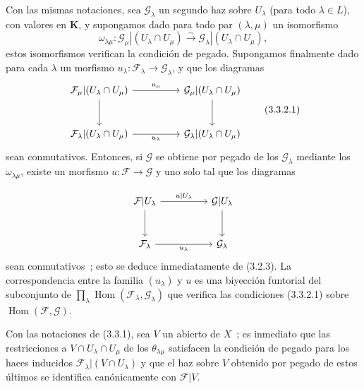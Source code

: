 \begin{env}[3.3.2]
\label{0.3.3.2-fr}
Con las mismas notaciones, sea $\mathcal{G}_\lambda$ un segundo haz sobre
$U_\lambda$ (para todo $\lambda\in L$), con valores en $\boldsymbol{K}$, y supongamos
dado para todo par $(\lambda,\mu)$ un isomorfismo
\[
  \omega_{\lambda\mu}:
  \mathcal{G}_\mu|(U_\lambda\cap U_\mu)
  \xrightarrow{\sim}
  \mathcal{G}_\lambda|(U_\lambda\cap U_\mu),
\]
estos isomorfismos verifican la condición de pegado. Supongamos finalmente dado
para cada $\lambda$ un morfismo
$u_\lambda:\mathcal{F}_\lambda\to\mathcal{G}_\lambda$, y que los diagramas
\begin{equation}
\begin{tikzcd}[column sep=huge,row sep=large]
\mathcal{F}_\mu|(U_\lambda\cap U_\mu)
  \arrow[r,"u_\mu"] \arrow[d]
  & \mathcal{G}_\mu|(U_\lambda\cap U_\mu) \arrow[d] \\
\mathcal{F}_\lambda|(U_\lambda\cap U_\mu)
  \arrow[r,"u_\lambda"']
  & \mathcal{G}_\lambda|(U_\lambda\cap U_\mu)
\end{tikzcd}
\tag{3.3.2.1}\label{0.3.3.2.1-fr}
\end{equation}
sean conmutativos. Entonces, si $\mathcal{G}$ se obtiene por pegado de los
$\mathcal{G}_\lambda$ mediante los $\omega_{\lambda\mu}$, existe un
morfismo $u:\mathcal{F}\to\mathcal{G}$ y uno solo tal que los diagramas


\[
\begin{tikzcd}[column sep=huge,row sep=large]
\mathcal{F}|U_\lambda
  \arrow[r,"u|U_\lambda"] \arrow[d]
  & \mathcal{G}|U_\lambda \arrow[d] \\
\mathcal{F}_\lambda
  \arrow[r,"u_\lambda"']
  & \mathcal{G}_\lambda
\end{tikzcd}
\]
sean conmutativos~; esto se deduce inmediatamente de (3.2.3). La correspondencia entre
la familia $(u_\lambda)$ y $u$ es una biyección funtorial del subconjunto de
$\prod_\lambda\operatorname{Hom}(\mathcal{F}_\lambda,\mathcal{G}_\lambda)$
que verifica las condiciones (3.3.2.1) sobre
$\operatorname{Hom}(\mathcal{F},\mathcal{G})$.
\end{env}

\begin{env}[3.3.3]
\label{0.3.3.3-fr}
Con las notaciones de (3.3.1), sea $V$ un abierto de $X$~; es inmediato que
las restricciones a $V\cap U_\lambda\cap U_\mu$ de los $\theta_{\lambda\mu}$
satisfacen la condición de pegado para los haces inducidos
$\mathcal{F}_\lambda|(V\cap U_\lambda)$ y que el haz sobre $V$ obtenido por
pegado de estos últimos se identifica canónicamente con $\mathcal{F}|V$.
\end{env}
